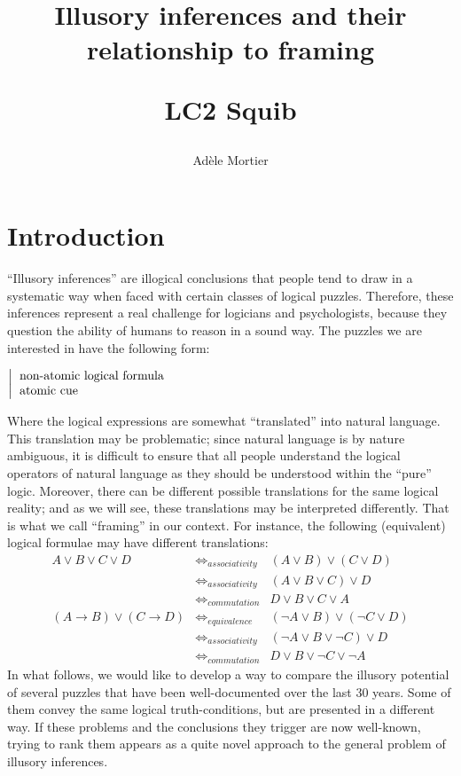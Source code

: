 \documentclass[french]{article}
\title{Illusory inferences and their relationship to framing \\  \begin{large}
		LC2 Squib
\end{large}}
\author{Adèle Mortier}
\begin{document}
	\nocite{*}
\maketitle
\section{Introduction}
``Illusory inferences'' \cite{johnsonlaird1999} are illogical conclusions that people tend to draw in a systematic way when faced with certain classes of logical puzzles. Therefore, these inferences represent a real challenge for logicians and psychologists, because they question the ability of humans to reason in a sound way. The puzzles we are interested in have the following form:
\begin{center}
	$\left |
	\begin{tabular}{l}
	non-atomic logical formula\\
	atomic cue
\end{tabular}\right.$
\end{center}
Where the logical expressions are somewhat ``translated'' into natural language. This translation may be problematic; since natural language is by nature ambiguous, it is difficult to ensure that all people understand the logical operators of natural language as they should be understood within the ``pure'' logic. Moreover, there can be different possible translations for the same logical reality; and as we will see, these translations may be interpreted differently. That is what we call ``framing'' in our context. For instance, the following (equivalent) logical formulae may have different translations:
\begin{eqnarray*}
A \vee B \vee C \vee D &\iff_{associativity}& (A \vee B) \vee (C \vee D)\\ &\iff_{associativity}& (A \vee B \vee C) \vee D \\ &\iff_{commutation}& D \vee B \vee C \vee A \\
(A \rightarrow B) \vee (C \rightarrow D) &\iff_{equivalence}& (\neg A \vee B) \vee (\neg C \vee D) \\ &\iff_{associativity}& (\neg A \vee B \vee \neg C) \vee D\\ &\iff_{commutation}& D \vee B \vee \neg C \vee \neg A
\end{eqnarray*}
In what follows, we would like to develop a way to compare the illusory potential of several puzzles that have been well-documented over the last 30 years. Some of them convey the same logical truth-conditions, but are presented in a different way. If these problems and the conclusions they trigger are now well-known, trying to rank them appears as a quite novel approach to the general problem of illusory inferences.
\end{document}
